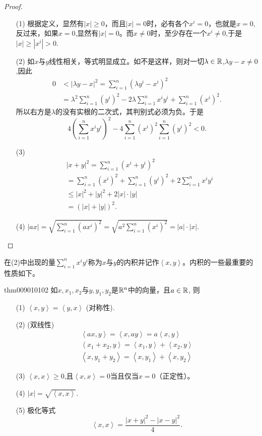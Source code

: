 \begin{proof}
\begin{enumerate}
\item[(1)] 根据定义，显然有$|x| \ge 0$，而且$|x|=0$时，必有各个$x^i=0$，也就是$x=0$,反过来，如果$x=0$,显然有$|x|=0$。而$x \neq 0$时，至少存在一个$x^i \neq 0$,于是$|x| \ge |x^i|>0$.

\item[(2)] 如$x$与$y$线性相关，等式明显成立。如不是这样，则对一切$\lambda \in \mathbb{R}$,$\lambda{}y - x \neq 0$,因此
\[
\begin{aligned}
0 &< |\lambda{}y - x|^2 = \sum_{i=1}^{n}{(\lambda{}y^i - x^i)^2}\\
&= \lambda^2\sum_{i=1}^{n}{(y^i)^2} - 2\lambda\sum_{i=1}^{n}{x^iy^i} + \sum_{i=1}^{n}{(x^i)^2}.
\end{aligned}
\]
所以右方是$\lambda$的没有实根的二次式，其判别式必须为负。于是
\[
4\left(\sum_{i=1}^{n}{x^iy^i}\right)^2 - 4\sum_{i=1}^{n}{(x^i)^2}\sum_{i=1}^{n}{(y^i)^2}<0.
\]

\item[(3)]
\begin{equation*}
\begin{aligned}
&|x + y|^2 = \sum_{i=1}^{n}{(x^i+y^i)^2} \\
& = \sum_{i=1}^{n}{(x^i)^2} + \sum_{i=1}^{n}{(y^i)^2} + 2\sum_{i=1}^{n}{x^iy^i} \\
& \le |x|^2+|y|^2+2|x|\cdot|y| \\
&=(|x|+|y|)^2.
\end{aligned}
\end{equation*}

\item[(4)] $|ax| = \sqrt{\sum\limits_{i=1}^{n}{(ax^i)^2}} = \sqrt{a^2\sum\limits_{i=1}^{n}{(x^i)^2}} = |a|\cdot|x|$.
\end{enumerate}
\end{proof}

在(2)中出现的量$\sum\limits_{i=1}^{n}{x^iy^i}$称为$x$与$y$的内积并记作$\left<x,y\right>$。内积的一些最重要的性质如下。
\begin{theorem}{}{thm009010102}
如$x,x_1,x_2$与$y,y_1,y_2$是$\mathbb{R}^n$中的向量，且$a \in \mathbb{R}$, 则
\begin{enumerate}
\item[(1)] $\left<x,y\right>=\left<y,x\right>$ (对称性).
\item[(2)] (双线性)
\begin{gather*}
\left<ax, y\right> = \left<x, ay\right> = a\left<x, y\right>\\
\left<x_1 + x_2, y\right> = \left<x_1, y\right> + \left<x_2, y\right> \\
\left<x, y_1+y_2\right> = \left<x, y_1\right> + \left<x, y_2\right>
\end{gather*}
\item[(3)] $\left<x, x\right> \ge 0$,且$\left<x, x\right>=0$当且仅当$x=0$（正定性）。
\item[(4)] $|x| = \sqrt{\left<x, x\right>}$.
\item[(5)] 极化等式
\[
\left<x, x\right> = \frac{|x+y|^2 - |x-y|^2}{4}.
\]
\end{enumerate}
\end{theorem}


